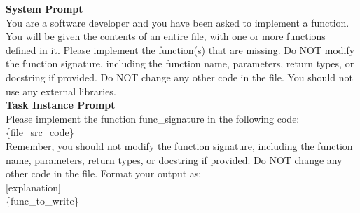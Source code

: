 \begin{example}
\small
\textbf{System Prompt} \\
  You are a software developer and you have been asked to implement a function. \\

  You will be given the contents of an entire file, with one or more functions defined in it.
  Please implement the function(s) that are missing.
  Do NOT modify the function signature, including the function name, parameters, return types, or docstring if provided.
  Do NOT change any other code in the file.
  You should not use any external libraries. \\


\textbf{Task Instance Prompt} \\
  Please implement the function {func\_signature} in the following code: \\

  \{file\_src\_code\} \\

  Remember, you should not modify the function signature, including the function name, parameters, return types, or docstring if provided.
  Do NOT change any other code in the file.
  Format your output as: \\

  [explanation] \\

  \{func\_to\_write\}
\end{example}
\label{fig:prompt_reimplement_func_with_lm}